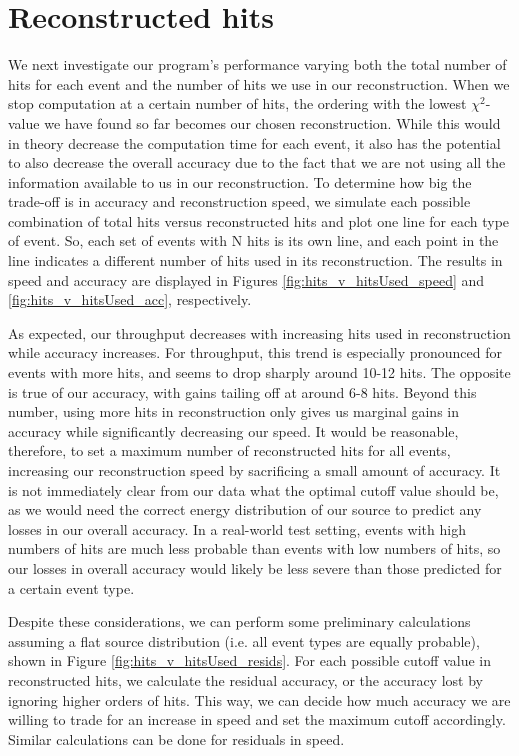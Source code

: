 
\section{Reconstructed hits}
\label{reconhits}
We next investigate our program's performance varying both the total number of hits for each event and the number of hits we use in our reconstruction. When we stop computation at a certain number of hits, the ordering with the lowest $\chi^2$-value we have found so far becomes our chosen reconstruction. While this would in theory decrease the computation time for each event, it also has the potential to also decrease the overall accuracy due to the fact that we are not using all the information available to us in our reconstruction. To determine how big the trade-off is in accuracy and reconstruction speed, we simulate each possible combination of total hits versus reconstructed hits and plot one line for each type of event. So, each set of events with N hits is its own line, and each point in the line indicates a different number of hits used in its reconstruction. The results in speed and accuracy are displayed in Figures \ref{fig:hits_v_hitsUsed_speed} and \ref{fig:hits_v_hitsUsed_acc}, respectively.

As expected, our throughput decreases with increasing hits used in reconstruction while accuracy increases. For throughput, this trend is especially pronounced for events with more hits, and seems to drop sharply around 10-12 hits. The opposite is true of our accuracy, with gains tailing off at around 6-8 hits. Beyond this number, using more hits in reconstruction only gives us marginal gains in accuracy while significantly decreasing our speed. It would be reasonable, therefore, to set a maximum number of reconstructed hits for all events, increasing our reconstruction speed by sacrificing a small amount of accuracy. It is not immediately clear from our data what the optimal cutoff value should be, as we would need the correct energy distribution of our source to predict any losses in our overall accuracy. In a real-world test setting, events with high numbers of hits are much less probable than events with low numbers of hits, so our losses in overall accuracy would likely be less severe than those predicted for a certain event type.

Despite these considerations, we can perform some preliminary calculations assuming a flat source distribution (i.e. all event types are equally probable), shown in Figure \ref{fig:hits_v_hitsUsed_resids}. For each possible cutoff value in reconstructed hits, we calculate the residual accuracy, or the accuracy lost by ignoring higher orders of hits. This way, we can decide how much accuracy we are willing to trade for an increase in speed and set the maximum cutoff accordingly. Similar calculations can be done for residuals in speed.

